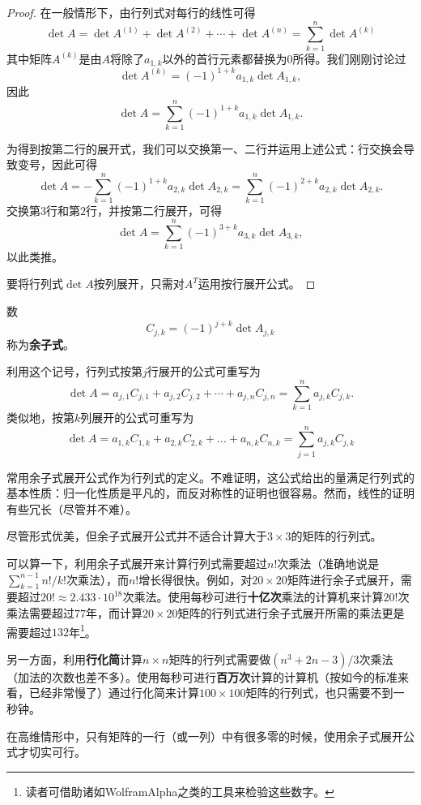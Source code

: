 \begin{proof}
  在一般情形下，由行列式对每行的线性可得\[\det A=\det A^{(1)}+\det A^{(2)}+\cdots+\det A^{(n)}=\sum_{k=1}^n\det A^{(k)}\]
  其中矩阵$A^{(k)}$是由$A$将除了$a_{1,k}$以外的首行元素都替换为$0$所得。我们刚刚讨论过\[\det A^{(k)}=(-1)^{1+k}a_{1,k}\det A_{1,k},\]
  因此\[\det A=\sum_{k=1}^n(-1)^{1+k}a_{1,k}\det A_{1,k}.\]

  为得到按第二行的展开式，我们可以交换第一、二行并运用上述公式：行交换会导致变号，因此可得\[\det A=-\sum_{k=1}^n(-1)^{1+k}a_{2,k}\det A_{2,k}=\sum_{k=1}^n(-1)^{2+k}a_{2,k}\det A_{2,k}.\]
  交换第$3$行和第$2$行，并按第二行展开，可得\[\det A=\sum_{k=1}^n(-1)^{3+k}a_{3,k}\det A_{3,k},\]
  以此类推。

  要将行列式$\det A$按列展开，只需对$A^T$运用按行展开公式。
\end{proof}

\begin{definition*}
  数\[C_{j,k}=(-1)^{j+k}\det A_{j,k}\]称为{\bf 余子式}。
\end{definition*}

利用这个记号，行列式按第$j$行展开的公式可重写为\[\det A=a_{j,1}C_{j,1}+a_{j,2}C_{j,2}+\cdots+a_{j,n}C_{j,n}=\sum_{k=1}^{n}a_{j,k}C_{j,k}.\]
类似地，按第$k$列展开的公式可重写为\[\det A=a_{1,k}C_{1,k}+a_{2,k}C_{2,k}+\ldots+a_{n,k}C_{n,k}=\sum_{j=1}^{n}a_{j,k}C_{j,k}\]

\begin{remark*}
  常用余子式展开公式作为行列式的定义。不难证明，这公式给出的量满足行列式的基本性质：归一化性质是平凡的，而反对称性的证明也很容易。然而，线性的证明有些冗长（尽管并不难）。
\end{remark*}
\begin{remark*}
  尽管形式优美，但余子式展开公式并不适合计算大于$3\times 3$的矩阵的行列式。

  可以算一下，利用余子式展开来计算行列式需要超过$n!$次乘法（准确地说是$\sum_{k=1}^{n-1}n!/k!$次乘法），而$n!$增长得很快。例如，对$20\times 20$矩阵进行余子式展开，需要超过$20!\approx 2.433\cdot 10^{18}$次乘法。使用每秒可进行{\bf 十亿次}乘法的计算机来计算$20!$次乘法需要超过$77$年，而计算$20\times 20$矩阵的行列式进行余子式展开所需的乘法更是需要超过$132$年\footnote{读者可借助诸如WolframAlpha之类的工具来检验这些数字。}。

  另一方面，利用{\bf 行化简}计算$n\times n$矩阵的行列式需要做$(n^{3}+2n-3)/3$次乘法（加法的次数也差不多）。使用每秒可进行{\bf 百万次}计算的计算机（按如今的标准来看，已经非常慢了）通过行化简来计算$100\times 100$矩阵的行列式，也只需要不到一秒钟。

  在高维情形中，只有矩阵的一行（或一列）中有很多零的时候，使用余子式展开公式才切实可行。
\end{remark*}

